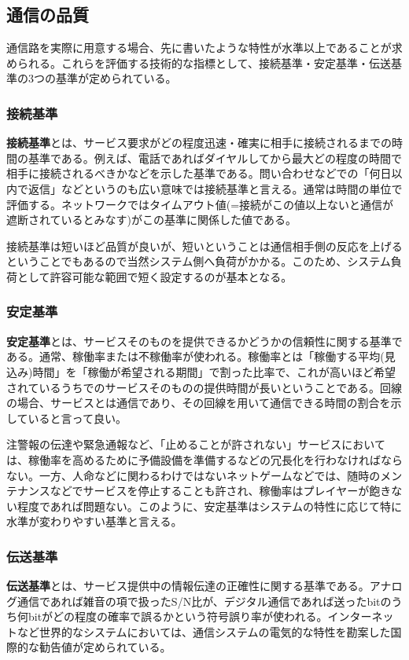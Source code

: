 \subsection{通信の品質}
通信路を実際に用意する場合、先に書いたような特性が水準以上であることが求められる。これらを評価する技術的な指標として、接続基準・安定基準・伝送基準の3つの基準が定められている。

\subsubsection{接続基準}
\textbf{接続基準}とは、サービス要求がどの程度迅速・確実に相手に接続されるまでの時間の基準である。例えば、電話であればダイヤルしてから最大どの程度の時間で相手に接続されるべきかなどを示した基準である。問い合わせなどでの「何日以内で返信」などというのも広い意味では接続基準と言える。通常は時間の単位で評価する。ネットワークではタイムアウト値(=接続がこの値以上ないと通信が遮断されているとみなす)がこの基準に関係した値である。

接続基準は短いほど品質が良いが、短いということは通信相手側の反応を上げるということでもあるので当然システム側へ負荷がかかる。このため、システム負荷として許容可能な範囲で短く設定するのが基本となる。

\subsubsection{安定基準}
\textbf{安定基準}とは、サービスそのものを提供できるかどうかの信頼性に関する基準である。通常、稼働率または不稼働率が使われる。稼働率とは「稼働する平均(見込み)時間」を「稼働が希望される期間」で割った比率で、これが高いほど希望されているうちでのサービスそのものの提供時間が長いということである。回線の場合、サービスとは通信であり、その回線を用いて通信できる時間の割合を示していると言って良い。

注警報の伝達や緊急通報など、「止めることが許されない」サービスにおいては、稼働率を高めるために予備設備を準備するなどの冗長化を行わなければならない。一方、人命などに関わるわけではないネットゲームなどでは、随時のメンテナンスなどでサービスを停止することも許され、稼働率はプレイヤーが飽きない程度であれば問題ない。このように、安定基準はシステムの特性に応じて特に水準が変わりやすい基準と言える。

\subsubsection{伝送基準}
\textbf{伝送基準}とは、サービス提供中の情報伝達の正確性に関する基準である。アナログ通信であれば雑音の項で扱ったS/N比が、デジタル通信であれば送ったbitのうち何bitがどの程度の確率で誤るかという符号誤り率が使われる。インターネットなど世界的なシステムにおいては、通信システムの電気的な特性を勘案した国際的な勧告値が定められている。


